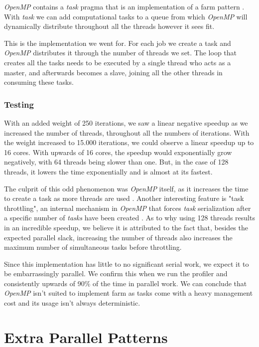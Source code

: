 \documentclass[10pt,journal]{IEEEtran}
\begin{document}
\textit{OpenMP} contains a \textit{task} pragma that is an implementation of a farm pattern \cite{jlfarm}. With \textit{task} we can add computational tasks to a queue from which \textit{OpenMP} will dynamically distribute throughout all the threads however it sees fit.

This is the implementation we went for. For each job we create a task and \textit{OpenMP} distributes it through the number of threads we set. The loop that creates all the tasks needs to be executed by a single thread who acts as a master, and afterwards becomes a slave, joining all the other threads in consuming these tasks.

\subsubsection{Testing}

With an added weight of 250 iterations, we saw a linear negative speedup as we increased the number of threads, throughout all the numbers of iterations. With the weight increased to 15.000 iterations, we could observe a linear speedup up to 16 cores. With upwards of 16 cores, the speedup would exponentially grow negatively, with 64 threads being slower than one. But, in the case of 128 threads, it lowers the time exponentially and is almost at its fastest.

The culprit of this odd phenomenon was \textit{OpenMP} itself, as it increases the time to create a task as more threads are used \cite{granularity}. Another interesting feature is "task throttling", an internal mechanism in \textit{OpenMP} that forces \textit{task} serialization after a specific number of \textit{tasks} have been created \cite{granularity}. As to why using 128 threads results in an incredible speedup, we believe it is attributed to the fact that, besides the expected parallel slack, increasing the number of threads also increases the maximum number of simultaneous tasks before throttling.

Since this implementation has little to no significant serial work, we expect it to be embarrassingly parallel. We confirm this when we run the profiler and consistently upwards of 90\% of the time in parallel work. We can conclude that \textit{OpenMP} isn't suited to implement farm as tasks come with a heavy management cost and its usage isn't always deterministic. 

\section{Extra Parallel Patterns}
\end{document}
